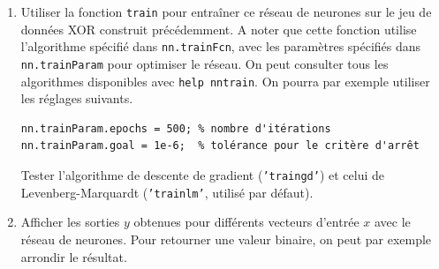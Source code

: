 \begin{enumerate}
\item Utiliser la fonction \texttt{train} pour entraîner ce réseau de neurones sur le jeu de données XOR construit précédemment. A noter que cette fonction utilise l'algorithme spécifié dans \texttt{nn.trainFcn}, avec les paramètres spécifiés dans \texttt{nn.trainParam} pour optimiser le réseau. On peut consulter tous les algorithmes disponibles avec \texttt{help nntrain}. On pourra par exemple utiliser les réglages suivants.
\begin{lstlisting}
nn.trainParam.epochs = 500; % nombre d'itérations
nn.trainParam.goal = 1e-6;  % tolérance pour le critère d'arrêt
\end{lstlisting}
Tester l'algorithme de descente de gradient (\texttt{'traingd'}) et celui de Levenberg-Marquardt (\texttt{'trainlm'}, utilisé par défaut).


\item Afficher les sorties $y$ obtenues pour différents vecteurs d'entrée $x$ avec le réseau de neurones. Pour retourner une valeur binaire, on peut par exemple arrondir le résultat.
\end{enumerate}


%
%	
%	
%	
%	
%	
